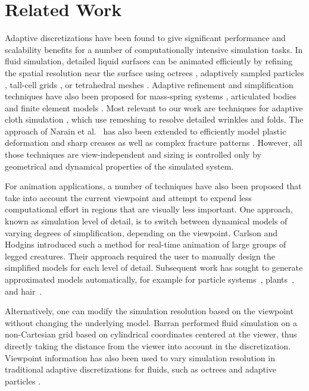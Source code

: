 \documentclass[10pt,journal,compsoc,twoside]{TexInputs/IEEEtran}
\begin{document}




\section{Related Work}

Adaptive discretizations have been found to give significant performance and
scalability benefits for a number of computationally intensive simulation
tasks. In fluid simulation, detailed liquid surfaces can be animated
efficiently by refining the spatial resolution near the surface using octrees
\cite{Losasso:2004:SWS}, adaptively sampled particles \cite{Adams:2007:ASP},
tall-cell grids \cite{Chentanez:2011:REW}, or tetrahedral meshes
\cite{Klingner:2006:FAD,Chentanez:2007:LSL,Ando:2013:HAL}. Adaptive refinement
and simplification techniques have also been proposed for mass-spring systems
\cite{Hutchinson:1996:ARM}, articulated bodies \cite{Redon:2005:ADA} and
finite element models \cite{Grinspun:2002:CSF}. Most relevant to our work
are techniques for adaptive cloth simulation
\cite{Thingvold:1990:PMB,Li:2005:CAA,Villard:2005:AMC,Brochu:2012:EGE,Narain:2012:AAR},
which use remeshing to resolve detailed wrinkles and folds. The approach of
Narain et al.~\cite{Narain:2012:AAR} has also been extended to efficiently model
plastic deformation and sharp creases \cite{Narain:2013:FCA} as well as complex
fracture patterns \cite{Pfaff:2014:ATC}. However, all those techniques 
are view-independent and sizing is controlled only by geometrical and dynamical
properties of the simulated system.

For animation applications, a number of techniques have also been proposed that
take into account the current viewpoint and attempt to expend less
computational effort in regions that are visually less important. One approach,
known as simulation level of detail, is to switch between dynamical
models of varying degrees of simplification, depending on the viewpoint.
Carlson and Hodgins \cite{Carlson:1997:SLD} introduced such a method for
real-time animation of large groups of legged creatures. Their
approach required the user to manually design the simplified models for each
level of detail.%
Subsequent work has sought to generate approximated
models automatically, for example for particle systems~\cite{OBrien:2001:ASP},
plants~\cite{Beaudoin:2004:SLD}, and hair~\cite{Ward:2003:MHU}.

Alternatively, one can modify the simulation resolution based on the viewpoint without changing the underlying model.
Barran \cite{Barran:2006:VDF} performed fluid simulation on a non-Cartesian grid based on cylindrical coordinates centered at the viewer, thus directly taking the distance from the viewer into account in the
discretization.
Viewpoint information has also been used to vary simulation resolution in traditional adaptive discretizations for fluids, such as octrees \cite{Kim:2006:VAA,Bunlutangtum:2011:EVA} and adaptive particles \cite{Solenthaler:2011:TPS}.
\end{document}
